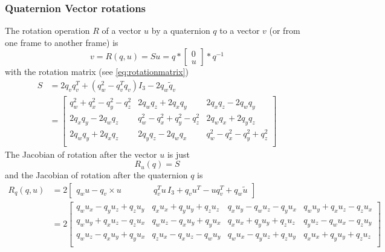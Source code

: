 \subsubsection{Quaternion Vector rotations}
The rotation operation $R$ of a vector $u$ by a quaternion $q$ to a vector $v$ (or from one frame to another frame) is 
\begin{equation}
    v = R (q, u ) = S u = q * \begin{bmatrix} 0 \\ u \end{bmatrix} * q^{-1}
\end{equation}
with the rotation matrix (see \autoref{eq:rotationmatrix})
\begin{align}
    S &= 2 q_v q_v^T + (q_w^2-q_v^T q_v) I_3 - 2 q_w \tilde q_v \\
    &= \begin{bmatrix}
         q_w^2 + q_x^2 - q_y^2 - q_z^2 & 2 q_w q_z + 2 q_x q_y & 2 q_x q_z - 2 q_w q_y \\
    2 q_x q_y - 2 q_w q_z & q_w^2 - q_x^2 + q_y^2 - q_z^2 & 2 q_w q_x + 2 q_y q_z \\
    2 q_w q_y + 2 q_x q_z & 2 q_y q_z - 2 q_w q_x & q_w^2 - q_x^2 - q_y^2 + q_z^2 \\
    \end{bmatrix}
\end{align}
The Jacobian of rotation after the vector $u$ is just
\begin{equation}
    R_u(q) = S
\end{equation}
and the Jacobian of rotation after the quaternion $q$ is
\begin{align}
    R_q(q,u) &=  2  \begin{bmatrix}
        q_w u - q_v \times u & \quad \quad \quad q_v^T u \, I_3 + q_v u^T - u q_v^T + q_w \tilde u
    \end{bmatrix} \\
    &= 2 \begin{bmatrix}
        q_w  u_x - q_y  u_z + q_z  u_y & q_x  u_x + q_y  u_y + q_z  u_z & q_x  u_y - q_w  u_z - q_y  u_x & q_w  u_y + q_x  u_z - q_z  u_x \\ 
    q_w  u_y + q_x  u_z - q_z  u_x & q_w  u_z - q_x  u_y + q_y  u_x & q_x  u_x + q_y  u_y + q_z  u_z & q_y  u_z - q_w  u_x - q_z  u_y \\ 
    q_w  u_z - q_x  u_y + q_y  u_x & q_z  u_x - q_x  u_z - q_w  u_y & q_w  u_x - q_y  u_z + q_z  u_y & q_x  u_x + q_y  u_y + q_z  u_z \\ 
    \end{bmatrix}
\end{align}


